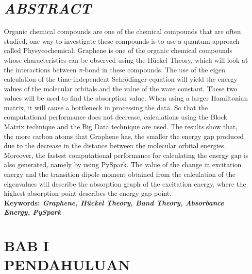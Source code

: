 \documentclass[12pt,a4paper]{report}
\renewcommand{\headrulewidth}{0pt}%
\renewcommand\headrulewidth{0pt}
\renewcommand{\headrulewidth}{0pt}
\begin{document}
\chapter*{\centering \textit{ABSTRACT}}
\thispagestyle{myplain}
\begin{spacing}{1.0}
\noindent Organic chemical compounds are one of the chemical compounds that are often studied, one way to investigate these compounds is to use a quantum approach called Physycochemical. Graphene is one of the organic chemical compounds whose characteristics can be observed using the Hückel Theory, which will look at the interactions between $\pi$-bond in these compounds. The use of the eigen calculation of the time-independent Schrödinger equation will yield the energy values of the molecular orbitals and the value of the wave constant. These two values will be used to find the absorption value. When using a larger Hamiltonian matrix, it will cause a bottleneck in processing the data. So that the computational performance does not decrease, calculations using the Block Matrix technique and the Big Data technique are used. The results show that, the more carbon atoms that Graphene has, the smaller the energy gap produced due to the decrease in the distance between the molecular orbital energies. Moreover, the fastest computational performance for calculating the energy gap is also generated, namely by using PySpark. The value of the change in excitation energy and the transition dipole moment obtained from the calculation of the eigenvalues will describe the absorption graph of the excitation energy, where the highest absorption point describes the energy gap point.\\
\textbf{Keywords: \textit{Graphene, Hückel Theory, Band Theory, Absorbance Energy, PySpark}}
\end{spacing}

\thispagestyle{myplain}
\fancypagestyle{plain}{%
\fancyhf{}
\renewcommand{\headrulewidth}{0pt}
\fancyfoot[C]{\thepage}
}
\newpage
\normalsize {\tableofcontents}
\newpage
\normalsize {\listoffigures}
\newpage
\normalsize {\listoftables}

\renewcommand{\thechapter}{\Roman{chapter}}
\chapter*{BAB I \\ PENDAHULUAN}
\renewcommand{\thesection}{\arabic{section}}
\setcounter{chapter}{+1}
\thispagestyle{myplain}
\setcounter{page}{8}				%
\end{document}
